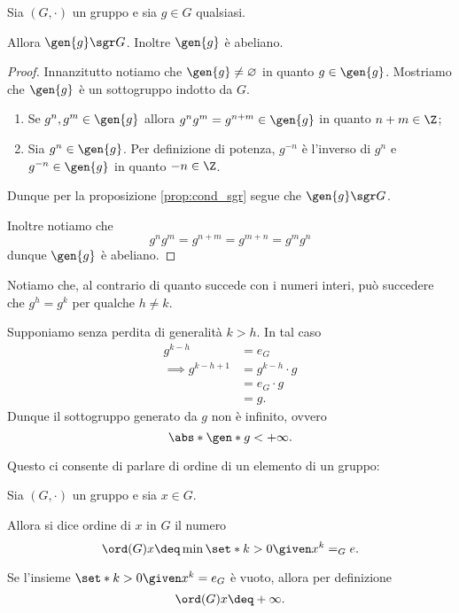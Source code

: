 \begin{proposition}
     \label{prop:sgr_generato_è_sgr}
    Sia $(G, \cdot)$ un gruppo e sia $g \in G$ qualsiasi.

    Allora $\gen{g} \sgr G$. Inoltre $\gen{g}$ è abeliano.
\end{proposition}
\begin{proof}
    Innanzitutto notiamo che $\gen{g} \neq \varnothing$ in quanto $g \in \gen{g}$. Mostriamo che $\gen{g}$ è un sottogruppo indotto da $G$.

    \begin{enumerate}[label={(\roman*)}]
        \item Se $g^n, g^m \in \gen{g}$ allora $g^ng^m = g^{n+m} \in \gen{g}$ in quanto $n+m \in \Z$;
        \item Sia $g^n \in \gen{g}$. Per definizione di potenza, $g^{-n}$ è l'inverso di $g^n$ e $g^{-n} \in \gen{g}$ in quanto $-n \in \Z$. 
    \end{enumerate}

    Dunque per la proposizione \ref{prop:cond_sgr} segue che $\gen{g} \sgr G$.

    Inoltre notiamo che \[
        g^ng^m = g^{n+m} = g^{m+n} = g^mg^n    
    \] dunque $\gen{g}$ è abeliano.
\end{proof}

Notiamo che, al contrario di quanto succede con i numeri interi, può succedere che $g^h = g^k$ per qualche $h \neq k$.

Supponiamo senza perdita di generalità $k > h$. In tal caso \begin{align*}
    g^{k-h} &= e_G\\
    \implies g^{k-h+1} &= g^{k-h} \cdot g\\
    &= e_G \cdot g\\
    &= g.
\end{align*}
Dunque il sottogruppo generato da $g$ non è infinito, ovvero \[
    \abs*{\gen*{g}} < +\infty.    
\]

Questo ci consente di parlare di ordine di un elemento di un gruppo:

\begin{definition}
     \label{def:ord_grp}
    Sia $(G, \cdot)$ un gruppo e sia $x \in G$.

    Allora si dice ordine di $x$ in $G$ il numero \[
        \ord(G){x} \deq \min\set*{k > 0 \given x^k = _Ge}.    
    \]

    Se l'insieme $\set*{k > 0 \given x^k = e_G}$ è vuoto, allora per definizione \[
        \ord(G){x} \deq +\infty.
    \]
\end{definition}

